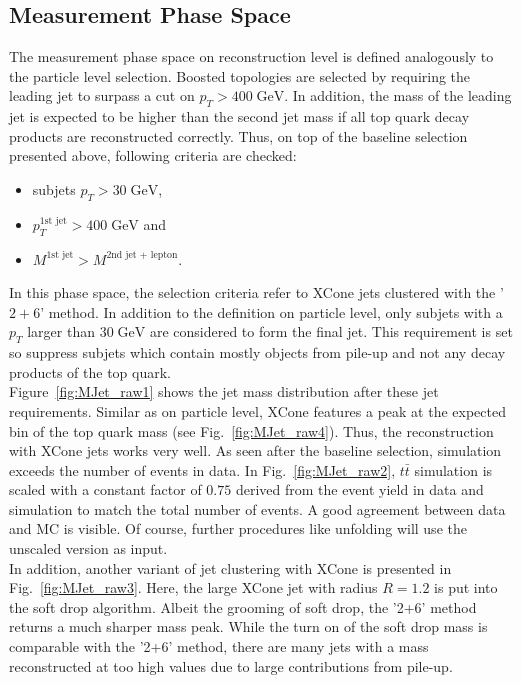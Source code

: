 \FloatBarrier %
\subsection{Measurement Phase Space}
\label{sec:FinalSel}
	The measurement phase space on reconstruction level is defined analogously to the particle level selection. Boosted topologies are selected by requiring the leading jet to surpass a cut on $p_T > 400\;\text{GeV}$. In addition, the mass of the leading jet is expected to be higher than the second jet mass if all top quark decay products are reconstructed correctly. Thus, on top of the baseline selection presented above, following criteria are checked:
	\begin{itemize}
	\item subjets $p_T > 30\;\text{GeV}$,
	\item $p_T^{\text{1st jet}} > 400\;\text{GeV}$ and
	\item $M^{\text{1st jet}} > M^{\text{2nd jet + lepton}}$.
	\end{itemize}
	In this phase space, the selection criteria refer to XCone jets clustered with the '$2+6$' method. In addition to the definition on particle level, only subjets with a $p_T$ larger than $30\;\text{GeV}$ are considered to form the final jet. This requirement is set so suppress subjets which contain mostly objects from pile-up and not any decay products of the top quark.\\
	Figure~\ref{fig:MJet_raw1} shows the jet mass distribution after these jet requirements. Similar as on particle level, XCone features a peak at the expected bin of the top quark mass (see Fig.~\ref{fig:MJet_raw4}). Thus, the reconstruction with XCone jets works very well. As seen after the baseline selection, simulation exceeds the number of events in data. In Fig.~\ref{fig:MJet_raw2}, $t\bar{t}$ simulation is scaled with a constant factor of $0.75$ derived from the event yield in data and simulation to match the total number of events. A good agreement between data and MC is visible. Of course, further procedures like unfolding will use the unscaled version as input.\\
	In addition, another variant of jet clustering with XCone is presented in Fig.~\ref{fig:MJet_raw3}. Here, the large XCone jet with radius $R=1.2$ is put into the soft drop algorithm. Albeit the grooming of soft drop, the '2+6' method returns a much sharper mass peak. While the turn on of the soft drop mass is comparable with the '2+6' method, there are many jets with a mass reconstructed at too high values due to large contributions from pile-up.
